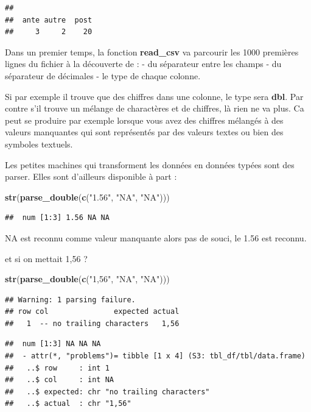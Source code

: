 \documentclass[
]{book}
\newenvironment{Shaded}{\begin{snugshade}}{\end{snugshade}}
\newcommand{\FunctionTok}[1]{\textcolor[rgb]{0.13,0.29,0.53}{\textbf{#1}}}
\newcommand{\NormalTok}[1]{#1}
\newcommand{\StringTok}[1]{\textcolor[rgb]{0.31,0.60,0.02}{#1}}
\begin{document}
\begin{verbatim}
## 
##  ante autre  post 
##     3     2    20
\end{verbatim}

Dans un premier temps, la fonction \textbf{read\_csv} va parcourir les 1000 premières
lignes du fichier à la découverte de :
- du séparateur entre les champs
- du séparateur de décimales
- le type de chaque colonne.

Si par exemple il trouve que des chiffres dans une colonne, le type sera \textbf{dbl}.
Par contre s'il trouve un mélange de charactères et de chiffres, là rien ne va
plus. Ca peut se produire par exemple lorsque vous avez des chiffres mélangés
à des valeurs manquantes qui sont représentés par des valeurs textes ou bien des
symboles textuels.

Les petites machines qui transforment les données en données typées sont des
parser. Elles sont d'ailleurs disponible à part :

\begin{Shaded}
\begin{Highlighting}[]
\FunctionTok{str}\NormalTok{(}\FunctionTok{parse\_double}\NormalTok{(}\FunctionTok{c}\NormalTok{(}\StringTok{"1.56"}\NormalTok{, }\StringTok{"NA"}\NormalTok{, }\StringTok{"NA"}\NormalTok{)))}
\end{Highlighting}
\end{Shaded}

\begin{verbatim}
##  num [1:3] 1.56 NA NA
\end{verbatim}

NA est reconnu comme valeur manquante alors pas de souci, le 1.56 est reconnu.

et si on mettait 1,56 ?

\begin{Shaded}
\begin{Highlighting}[]
\FunctionTok{str}\NormalTok{(}\FunctionTok{parse\_double}\NormalTok{(}\FunctionTok{c}\NormalTok{(}\StringTok{"1,56"}\NormalTok{, }\StringTok{"NA"}\NormalTok{, }\StringTok{"NA"}\NormalTok{)))}
\end{Highlighting}
\end{Shaded}

\begin{verbatim}
## Warning: 1 parsing failure.
## row col               expected actual
##   1  -- no trailing characters   1,56
\end{verbatim}

\begin{verbatim}
##  num [1:3] NA NA NA
##  - attr(*, "problems")= tibble [1 x 4] (S3: tbl_df/tbl/data.frame)
##   ..$ row     : int 1
##   ..$ col     : int NA
##   ..$ expected: chr "no trailing characters"
##   ..$ actual  : chr "1,56"
\end{verbatim}
\end{document}
